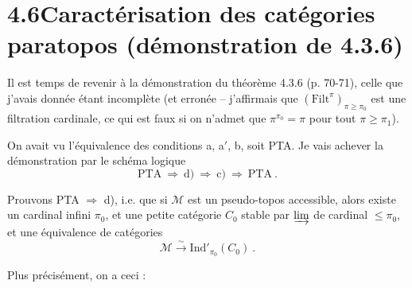 \documentclass[11pt]{article}
\newcommand{\printedpage}[1]{\marginpar{\footnotesize p.~#1}}
\newcommand{\msp}[1]{\marginpar{\footnotesize [#1]}}
\newcommand{\Ind}{\mathrm{Ind}}
\begin{document}
\printedpage{44}

\msp{page 139}

\section*{4.6\quad Caractérisation des catégories paratopos (démonstration de 4.3.6)}

Il est temps de revenir à la démonstration du théorème 4.3.6 (p. 70-71), celle que j'avais donnée étant incomplète (et erronée – j'affirmais que $(\mathrm{Filt}^{\pi})_{\pi\geqslant\pi_0}$ est une filtration cardinale, ce qui est faux si on n'admet que $\pi^{\pi_0}=\pi$ pour tout $\pi\geqslant\pi_1$).

On avait vu l'équivalence des conditions a, a$'$, b, soit PTA. Je vais achever la démonstration par le schéma logique
\[
\text{PTA} \ \Longrightarrow\ \text{d)} \ \Longrightarrow\ \text{c)} \ \Longrightarrow\ \text{PTA}\ . \tag*{$(*)$}
\]

Prouvons PTA $\Longrightarrow$ d), i.e. que si $\mathcal{M}$ est un pseudo-topos accessible, alors existe un cardinal infini $\pi_0$, et une petite catégorie $C_0$ stable par $\varinjlim$ de cardinal $\leqslant\pi_0$, et une équivalence de catégories %
\[
\mathcal{M} \xrightarrow{\ \sim\ } \Ind'_{\pi_0}(C_0)\ . \tag*{(4.6.1)}
\]

Plus précisément, on a ceci :
\end{document}
